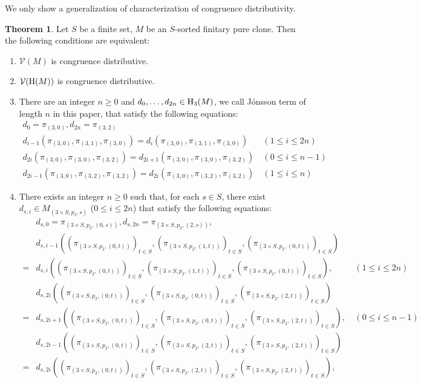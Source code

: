 \documentclass[a4paper,10pt]{article}
\theoremstyle{definition}
\newtheorem{thm}[df]{Theorem}
\newcommand\V{\mathcal{V}}
\begin{document}
We only show a generalization of characterization of congruence distributivity.
\begin{thm}
Let $S$ be a finite set, $M$ be an $S$-sorted finitary pure clone.
Then the following conditions are equivalent:
\begin{enumerate}
\item
$\V(M)$ is congruence distributive.
\item
$\V({\rm H}(M))$ is congruence distributive.
\item
There are an integer $n\geq 0$ and $d_0,\dots,d_{2n}\in {\rm H}_3(M)$,
we call J\'onsson term of length $n$ in this paper,
that satisfy the following equations:
\begin{align*}
d_0=\pi_{(3,0)},d_{2n}=\pi_{(3,2)}\\
d_{i-1}(\pi_{(3,0)},\pi_{(3,1)},\pi_{(3,0)})=d_{i}(\pi_{(3,0)},\pi_{(3,1)},\pi_{(3,0)})
 &\ (1\leq i\leq 2n)\\
d_{2i}(\pi_{(3,0)},\pi_{(3,0)},\pi_{(3,2)})=d_{2i+1}(\pi_{(3,0)},\pi_{(3,0)},\pi_{(3,2)})
 &\ (0\leq i\leq n-1)\\
d_{2i-1}(\pi_{(3,0)},\pi_{(3,2)},\pi_{(3,2)})=d_{2i}(\pi_{(3,0)},\pi_{(3,2)},\pi_{(3,2)})
 &\ (1\leq i\leq n)
\end{align*}
\item
There exists an integer $n\geq 0$ such that, for each $s\in S$, there exist
$d_{s,i}\in M_{(3\times S,p_2,s)}$ ($0\leq i\leq 2n$) that satisfy the following equations:
\begin{align*}
&d_{s,0}=\pi_{(3\times S,p_2,(0,s))},d_{s,2n}=\pi_{(3\times S,p_2,(2,s))},&\\
&d_{s,i-1}((\pi_{(3\times S,p_2,(0,t))})_{t\in S},(\pi_{(3\times S,p_2,(1,t))})_{t\in S},(\pi_{(3\times S,p_2,(0,t))})_{t\in S})&\\
 =&d_{s,i}((\pi_{(3\times S,p_2,(0,t))})_{t\in S},(\pi_{(3\times S,p_2,(1,t))})_{t\in S},(\pi_{(3\times S,p_2,(0,t))})_{t\in S}),
 &\ (1\leq i\leq 2n)\\
&d_{s,2i}((\pi_{(3\times S,p_2,(0,t))})_{t\in S},(\pi_{(3\times S,p_2,(0,t))})_{t\in S},(\pi_{(3\times S,p_2,(2,t))})_{t\in S})&\\
 =&d_{s,2i+1}((\pi_{(3\times S,p_2,(0,t))})_{t\in S},(\pi_{(3\times S,p_2,(0,t))})_{t\in S},(\pi_{(3\times S,p_2,(2,t))})_{t\in S}),
 &\ (0\leq i\leq n-1)\\
&d_{s,2i-1}((\pi_{(3\times S,p_2,(0,t))})_{t\in S},(\pi_{(3\times S,p_2,(2,t))})_{t\in S},(\pi_{(3\times S,p_2,(2,t))})_{t\in S})&\\
 =&d_{s,2i}((\pi_{(3\times S,p_2,(0,t))})_{t\in S},(\pi_{(3\times S,p_2,(2,t))})_{t\in S},(\pi_{(3\times S,p_2,(2,t))})_{t\in S}),

\end{align*}
\end{enumerate}
\end{thm}
\end{document}
